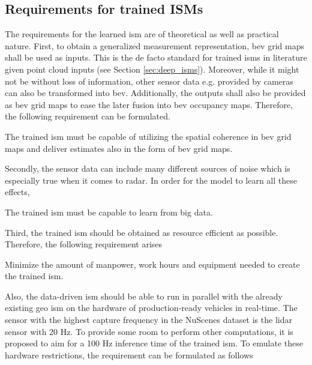 \subsection{Requirements for trained ISMs}
\label{subsec:requirements_for_ev_representation}
The requirements for the learned \gls{ism} are of theoretical as well as practical nature. First, to obtain a generalized measurement representation, \gls{bev} grid maps shall be used as inputs. This is the de facto standard for trained \gls{ism}s in literature given point cloud inputs (see Section \ref{sec:deep_isms}). Moreover, while it might not be without loss of information, other sensor data e.g. provided by cameras can also be transformed into \gls{bev}. Additionally, the outputs shall also be provided as \gls{bev} grid maps to ease the later fusion into \gls{bev} occupancy maps. Therefore, the following requirement can be formulated.
\\
\setcounter{req}{1}
\setcounter{subreq}{0}
\begin{subreq} \label{subreq:input_output}
	The trained \gls{ism} must be capable of utilizing the spatial coherence in \gls{bev} grid maps and deliver estimates also in the form of \gls{bev} grid maps.
\end{subreq}
Secondly, the sensor data can include many different sources of noise which is especially true when it comes to radar. In order for the model to learn all these effects, 
\\
\begin{subreq} \label{subreq:big_data}
	The trained \gls{ism} must be capable to learn from big data.
\end{subreq}
Third, the trained \gls{ism} should be obtained as resource efficient as possible. Therefore, the following requirement arises
\\
\begin{subreq} \label{subreq:min_requirements}
	Minimize the amount of manpower, work hours and equipment needed to create the trained \gls{ism}.
\end{subreq}
Also, the data-driven \gls{ism} should be able to run in parallel with the already existing geo \gls{ism} on the hardware of production-ready vehicles in real-time. The sensor with the highest capture frequency in the NuScenes dataset is the lidar sensor with 20 Hz. To provide some room to perform other computations, it is proposed to aim for a 100 Hz inference time of the trained \gls{ism}. To emulate these hardware restrictions, the requirement can be formulated as follows

